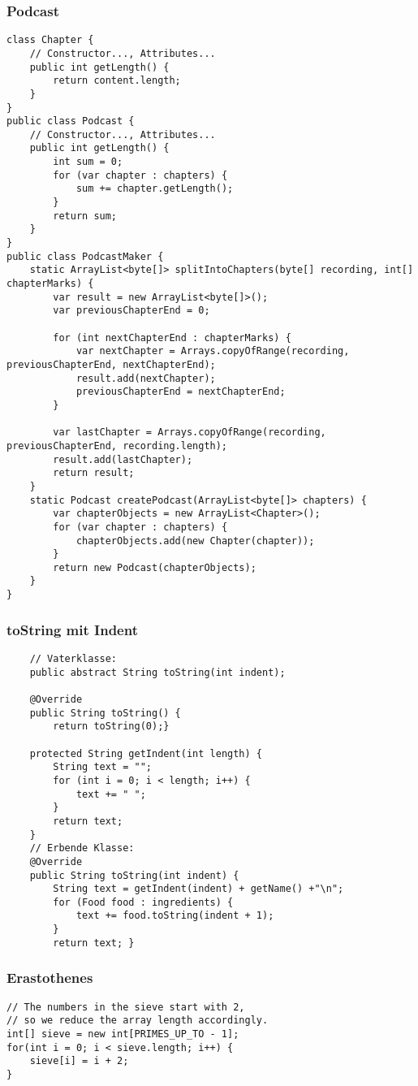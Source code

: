 \begin{multicols*}{5}
	\subsubsection{Podcast}
	\begin{lstlisting}
class Chapter {
	// Constructor..., Attributes...
	public int getLength() {
		return content.length;
	}
}
public class Podcast {
	// Constructor..., Attributes...
	public int getLength() {
		int sum = 0;
		for (var chapter : chapters) {
			sum += chapter.getLength();
		}
		return sum;
	}
}
public class PodcastMaker {
	static ArrayList<byte[]> splitIntoChapters(byte[] recording, int[] chapterMarks) {
		var result = new ArrayList<byte[]>();
		var previousChapterEnd = 0;
		
		for (int nextChapterEnd : chapterMarks) {
			var nextChapter = Arrays.copyOfRange(recording, previousChapterEnd, nextChapterEnd);
			result.add(nextChapter);
			previousChapterEnd = nextChapterEnd;
		}
		
		var lastChapter = Arrays.copyOfRange(recording, previousChapterEnd, recording.length);
		result.add(lastChapter);
		return result;
	}
	static Podcast createPodcast(ArrayList<byte[]> chapters) {
		var chapterObjects = new ArrayList<Chapter>();
		for (var chapter : chapters) {
			chapterObjects.add(new Chapter(chapter));
		}
		return new Podcast(chapterObjects);
	}
}
	\end{lstlisting}

	\subsubsection{toString mit Indent}
	\begin{lstlisting}
	// Vaterklasse:
	public abstract String toString(int indent);			
	
	@Override
	public String toString() {
		return toString(0);}
	
	protected String getIndent(int length) { 
		String text = ""; 
		for (int i = 0; i < length; i++) { 
			text += " ";
		}
		return text;
	}
	// Erbende Klasse:
	@Override
	public String toString(int indent) {
		String text = getIndent(indent) + getName() +"\n";
		for (Food food : ingredients) {
			text += food.toString(indent + 1);
		}
		return text; }
	\end{lstlisting}

	\columnbreak


	\subsubsection{Erastothenes}
		\begin{lstlisting}
// The numbers in the sieve start with 2,
// so we reduce the array length accordingly.
int[] sieve = new int[PRIMES_UP_TO - 1];
for(int i = 0; i < sieve.length; i++) {
	sieve[i] = i + 2;
}


\end{lstlisting}
\end{multicols*}
